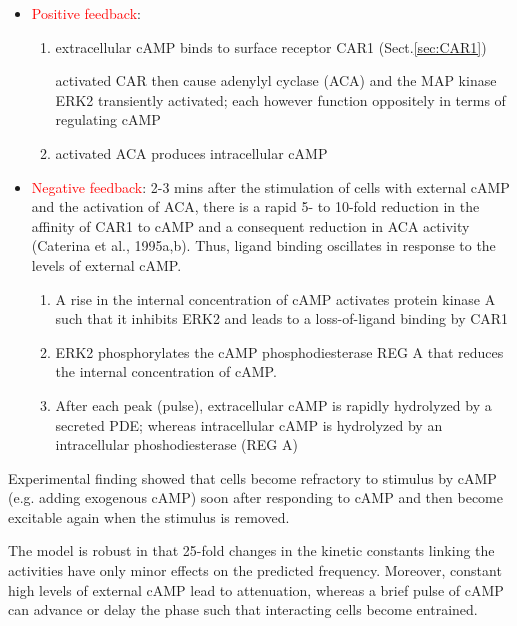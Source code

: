 \begin{itemize}
  \item \textcolor{red}{Positive feedback}:
  \begin{enumerate}
  \item  extracellular cAMP binds to surface receptor CAR1 (Sect.\ref{sec:CAR1})
  
  activated CAR then cause  adenylyl cyclase (ACA) and the MAP kinase ERK2 
  transiently activated; each however function oppositely in terms of regulating
  cAMP
  
  \item activated ACA produces intracellular cAMP

  \end{enumerate}

  \item \textcolor{red}{Negative feedback}: 2-3 mins after the stimulation of
  cells with external cAMP and the activation of ACA, there is a rapid 5- to
  10-fold reduction in the affinity of CAR1  to  cAMP  and  a  consequent 
  reduction  in  ACA activity  (Caterina et al.,  1995a,b).  
  Thus, ligand binding oscillates in response to the levels of external cAMP.
  
  \begin{enumerate}

    \item A rise in the internal concentration of cAMP activates protein kinase
   A such that it inhibits ERK2 and leads to a loss-of-ligand binding by CAR1

    \item ERK2 phosphorylates the cAMP phosphodiesterase REG A that reduces the
  internal concentration of cAMP.
  
    \item After each peak (pulse), extracellular cAMP is rapidly hydrolyzed by a
  secreted PDE; whereas  intracellular  cAMP  is hydrolyzed by an intracellular
 phoshodiesterase (REG A)

  \end{enumerate}
\end{itemize}
Experimental finding showed that cells become refractory to stimulus by
cAMP (e.g. adding exogenous cAMP) soon after responding to cAMP and then become
excitable again when the stimulus is removed.


The model is robust in that 25-fold changes in the kinetic constants linking the
activities have only minor effects on the predicted frequency. Moreover,
constant high levels of external cAMP lead to attenuation, whereas a brief pulse
of cAMP can advance or delay the phase such that interacting cells become
entrained.   


